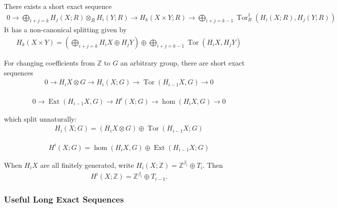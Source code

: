 \begin{theorem}[Kunneth]

There exists a short exact sequence
\begin{align*}
0 \to \bigoplus_{i+j=k} H_j(X; R) \otimes_R H_{i}(Y; R) \to H_k(X\times Y; R) \to \bigoplus_{i+j=k-1} \operatorname{Tor}_R^1(H_i(X; R), H_{j}(Y; R))
\end{align*}
It has a non-canonical splitting given by
\begin{align*}
H_k (X\times Y) = \left( \bigoplus_{i+j = k} H_i X \oplus H_j Y\right) \oplus \bigoplus_{i+j = k-1}\operatorname{Tor}(H_iX, H_j Y)
\end{align*}

\end{theorem}

\begin{theorem}

For changing coefficients from \({\mathbb{Z}}\) to \(G\) an arbitrary
group, there are short exact sequences
\begin{align*}
0 \to H_i X \otimes G \to H_i(X; G) \to \operatorname{Tor}(H_{i-1}X, G) \to 0
\end{align*}

\begin{align*}
0 \to \operatorname{Ext}(H_{i-1} X, G) \to H^i(X;G) \to \hom(H_i X, G) \to 0
\end{align*}

which split unnaturally:
\begin{align*}
H_i(X;G) = (H_iX\otimes G) \oplus \operatorname{Tor}(H_{i-1}X; G)
\end{align*}

\begin{align*}
H^i(X; G) = \hom(H_iX, G) \oplus \operatorname{Ext}(H_{i-1}X; G)
\end{align*}

When \(H_iX\) are all finitely generated, write
\(H_i(X; {\mathbb{Z}}) = {\mathbb{Z}}^{\beta_i} \oplus T_i\). Then
\begin{align*}
H^i(X; {\mathbb{Z}}) = {\mathbb{Z}}^{\beta_i} \oplus T_{i-1}.
\end{align*}

\end{theorem}

\hypertarget{useful-long-exact-sequences}{%
\subsubsection{Useful Long Exact
Sequences}\label{useful-long-exact-sequences}}

